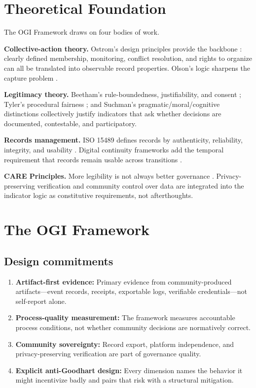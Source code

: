 \documentclass[sigconf]{acmart}
\begin{document}
\section{Theoretical Foundation}

The OGI Framework draws on four bodies of work.

\textbf{Collective-action theory.} Ostrom's design principles provide the backbone \cite{ostrom1990}: clearly defined membership, monitoring, conflict resolution, and rights to organize can all be translated into observable record properties. Olson's logic sharpens the capture problem \cite{olson1965}.

\textbf{Legitimacy theory.} Beetham's rule-boundedness, justifiability, and consent \cite{beetham1991}; Tyler's procedural fairness \cite{tyler2006}; and Suchman's pragmatic/moral/cognitive distinctions \cite{suchman1995} collectively justify indicators that ask whether decisions are documented, contestable, and participatory.

\textbf{Records management.} ISO 15489 defines records by authenticity, reliability, integrity, and usability \cite{iso2016}. Digital continuity frameworks add the temporal requirement that records remain usable across transitions \cite{natarchives2017}.

\textbf{CARE Principles.} More legibility is not always better governance \cite{carroll2020}. Privacy-preserving verification and community control over data are integrated into the indicator logic as constitutive requirements, not afterthoughts.

\section{The OGI Framework}

\subsection{Design commitments}

\begin{enumerate}
\item \textbf{Artifact-first evidence:} Primary evidence from community-produced artifacts---event records, receipts, exportable logs, verifiable credentials---not self-report alone.
\item \textbf{Process-quality measurement:} The framework measures accountable process conditions, not whether community decisions are normatively correct.
\item \textbf{Community sovereignty:} Record export, platform independence, and privacy-preserving verification are part of governance quality.
\item \textbf{Explicit anti-Goodhart design:} Every dimension names the behavior it might incentivize badly and pairs that risk with a structural mitigation.
\end{enumerate}
\end{document}
